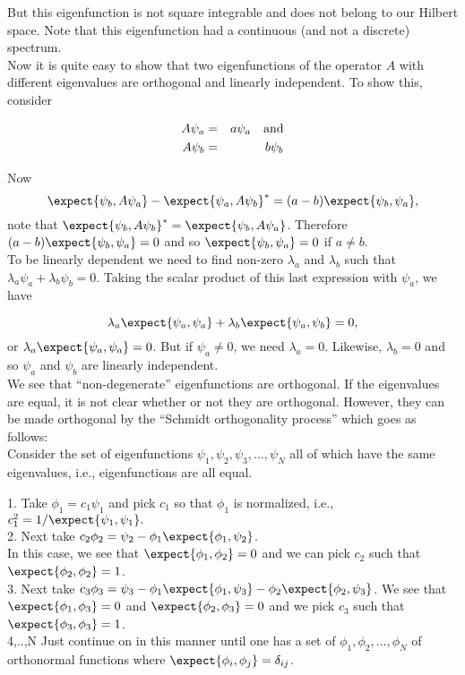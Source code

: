 But this eigenfunction is not square integrable and does not belong to our Hilbert space. Note that this eigenfunction had a continuous (and not
a discrete) spectrum.\\

Now it is quite easy to show that two eigenfunctions of the operator $A$ with different eigenvalues are orthogonal and linearly independent. To 
show this, consider 

\begin{eqnarray*}
A \psi_a&=&a \psi_a \quad \hbox{and} \\
A \psi_b&=&b \psi_b\\
\end{eqnarray*} 

Now
\[ \expect{\psi_b, A \psi_a} - \expect{\psi_a, A\psi_b}^* = (a - b)\expect{\psi_b,\psi_a},\]
note that $\expect{\psi_b,A\psi_b}^* = \expect{\psi_b,A\psi_a}$. Therefore
$(a-b)\expect{\psi_b,\psi_a} = 0$ and so $\expect{\psi_b,\psi_a} = 0$ if $a\ne b$. \\

To be linearly dependent we need to find non-zero $\lambda_a$ and $\lambda_b$ such that $\lambda_a \psi_a + \lambda_b \psi_b = 0$. 
Taking the scalar product of this last expression with $\psi_a$, we have 

\[ \lambda_a \expect{\psi_a,\psi_a} + \lambda_b \expect{\psi_a,\psi_b} = 0,\] or $\lambda_a \expect{\psi_a,\psi_a} = 0$. But if $\psi_a\ne 0$, we need
$\lambda_a = 0$. Likewise, $\lambda_b = 0$ and so $\psi_a$ and $\psi_b$ are linearly independent. \\

We see that ``non-degenerate'' eigenfunctions are orthogonal. If the eigenvalues are equal, it is not clear whether or not they are orthogonal. However,
they can be made orthogonal by the 	``Schmidt orthogonality process'' which goes as follows:\\

Consider the set of eigenfunctions $\psi_1, \psi_2, \psi_3,..., \psi_N$ all of which have the same eigenvalues, i.e., eigenfunctions are all equal.

1. Take $\phi_1 = c_1 \psi_1$  and pick $c_1$ so that $\phi_1$ is normalized, i.e., $c_1^2 = 1/\expect{\psi_1,\psi_1}.$\\
2. Next take $c_2 \phi_2 = \psi_2 - \phi_1\expect{\phi_1,\psi_2}$.\\
In this case, we see that $\expect{\phi_1,\phi_2} = 0$ and we can pick $c_2$ such that $\expect{\phi_2,\phi_2} = 1$.\\
3. Next take $c_3 \phi_3 = \psi_3 - \phi_1\expect{\phi_1,\psi_3} - \phi_2\expect{\phi_2,\psi_3}$. We see that $\expect{\phi_1,\phi_3} = 0$ and $\expect{\phi_2,\phi_3} = 0$
and we pick $c_3$ such that $\expect{\phi_3,\phi_3} = 1$.\\
4,..,N Just continue on in this manner until one has a set of $\phi_1, \phi_2,..., \phi_N$ of orthonormal functions where $\expect{\phi_i, \phi_j} = \delta_{ij}$.

